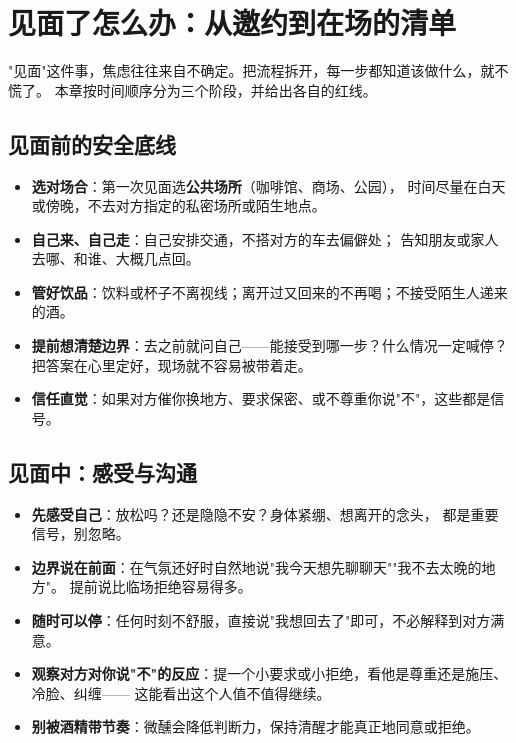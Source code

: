 \documentclass[12pt,UTF8,openany]{ctexbook}
\begin{document}
\tableofcontents
\clearpage
\chapter{见面了怎么办：从邀约到在场的清单}
\label{chap:meeting}

"见面"这件事，焦虑往往来自不确定。把流程拆开，每一步都知道该做什么，就不慌了。
本章按时间顺序分为三个阶段，并给出各自的红线。

\section{见面前的安全底线}

\begin{itemize}[leftmargin=2em]
  \item \textbf{选对场合}：第一次见面选\textbf{公共场所}（咖啡馆、商场、公园），
        时间尽量在白天或傍晚，不去对方指定的私密场所或陌生地点。
  \item \textbf{自己来、自己走}：自己安排交通，不搭对方的车去偏僻处；
        告知朋友或家人去哪、和谁、大概几点回。
  \item \textbf{管好饮品}：饮料或杯子不离视线；离开过又回来的不再喝；不接受陌生人递来的酒。
  \item \textbf{提前想清楚边界}：去之前就问自己——能接受到哪一步？什么情况一定喊停？
        把答案在心里定好，现场就不容易被带着走。
  \item \textbf{信任直觉}：如果对方催你换地方、要求保密、或不尊重你说"不"，这些都是信号。
\end{itemize}

\section{见面中：感受与沟通}

\begin{itemize}[leftmargin=2em]
  \item \textbf{先感受自己}：放松吗？还是隐隐不安？身体紧绷、想离开的念头，
        都是重要信号，别忽略。
  \item \textbf{边界说在前面}：在气氛还好时自然地说"我今天想先聊聊天""我不去太晚的地方"。
        提前说比临场拒绝容易得多。
  \item \textbf{随时可以停}：任何时刻不舒服，直接说"我想回去了"即可，不必解释到对方满意。
  \item \textbf{观察对方对你说"不"的反应}：提一个小要求或小拒绝，看他是尊重还是施压、冷脸、纠缠——
        这能看出这个人值不值得继续。
  \item \textbf{别被酒精带节奏}：微醺会降低判断力，保持清醒才能真正地同意或拒绝。
\end{itemize}
\end{document}
